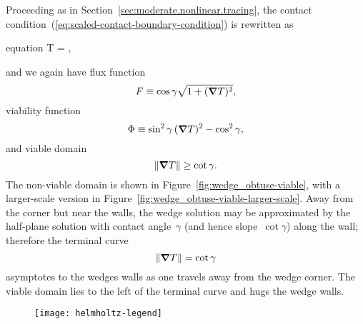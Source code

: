 Proceeding as in Section~\ref{sec:moderate.nonlinear.tracing},
the contact condition~(\ref{eq:scaled-contact-boundary-condition})
is rewritten as
\begin{important}{equation}
  \normalvec \dotp \del T = \cos\gamma {},
  \label{eq:re-entrant-flux-boundary-condition}
\end{important}
and we again have flux function
\begin{equation}
  F \equiv \cos\gamma \sqrt{1 + (\mathop{}\!\boldsymbol{\mathbf{\nabla}} T)^2},
  \label{eq:re-entrant-flux-function}
\end{equation}
viability function
\begin{equation}
  \Phi \equiv \sin^2\gamma \, (\mathop{}\!\boldsymbol{\mathbf{\nabla}} T)^2 - \cos^2\gamma,
  \label{eq:re-entrant-viability-function}
\end{equation}
and viable domain
\begin{equation}
  \lVert\mathop{}\!\boldsymbol{\mathbf{\nabla}} T\rVert \ge \cot\gamma.
  \label{eq:re-entrant-viable-domain}
\end{equation}
The non-viable domain is shown
in Figure~\ref{fig:wedge_obtuse-viable},
with a larger-scale version
in Figure~\ref{fig:wedge_obtuse-viable-larger-scale}.
Away from the corner but near the walls,
the wedge solution may be approximated by the half-plane solution
with contact angle~$\gamma$
(and hence slope~$\cot\gamma$)
along the wall;
therefore the terminal curve
\begin{equation}
  \lVert\mathop{}\!\boldsymbol{\mathbf{\nabla}} T\rVert = \cot\gamma
  \label{eq:re-entrant-terminal-curve}
\end{equation}
asymptotes to the wedges walls as one travels away from the wedge corner.
The viable domain lies to the left of the terminal curve
and hugs the wedge walls.

\begin{figure}
  \texttt{[image: helmholtz-legend]}
  \begin{minipage}[t]{0.5\textwidth}
  \end{minipage}
  \begin{minipage}[t]{0.5\textwidth}
  \end{minipage}
\end{figure}

